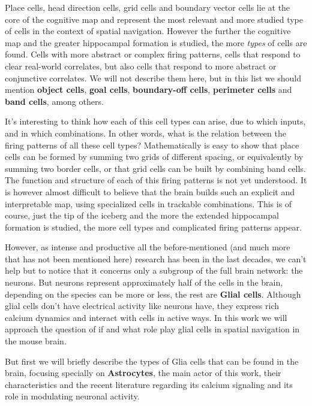 Place cells, head direction cells, grid cells and boundary vector cells lie at the core of the cognitive map and represent the most relevant and more studied type of cells in the context of spatial navigation. 
However the further the cognitive map and the greater hippocampal formation is studied, the more \textit{types} of cells are found. 
Cells with more abstract or complex firing patterns, cells that respond to clear real-world correlates, but also cells that respond to more abstract or conjunctive correlates. 
We will not describe them here, but in this list we should mention \textbf{object cells}, \textbf{goal cells}, \textbf{boundary-off cells}, \textbf{perimeter cells} and \textbf{band cells}, among others. 

It's interesting to think how each of this cell types can arise, due to which inputs, and in which combinations.
In other words, what is the relation between the firing patterns of all these cell types?
Mathematically is easy to show that place cells can be formed by summing two grids of different spacing, or equivalently by summing two border cells, or that grid cells can be built by combining band cells.
The function and structure of each of this firing patterns is not yet understood.
It is however almost difficult to believe that the brain builds such an explicit and interpretable map, using specialized cells in trackable combinations.
This is of course, just the tip of the iceberg and the more the extended hippocampal formation is studied, the more cell types and complicated firing patterns appear. 

However, as intense and productive all the before-mentioned (and much more that has not been mentioned here) research has been in the last decades, we can't help but to notice that it concerns only a subgroup of the full brain network: the neurons.
But neurons represent approximately half of the cells in the brain, depending on the species can be more or less, the rest are \textbf{Glial cells}.
Although glial cells don't have electrical activity like neurons have, they express rich calcium dynamics and interact with cells in active ways. 
In this work we will approach the question of if and what role play glial cells in spatial navigation in the mouse brain. 

But first we will briefly describe the types of Glia cells that can be found in the brain, focusing specially on \textbf{Astrocytes}, the main actor of this work,  their characteristics and the recent literature regarding its calcium signaling and its role in modulating neuronal activity. 

